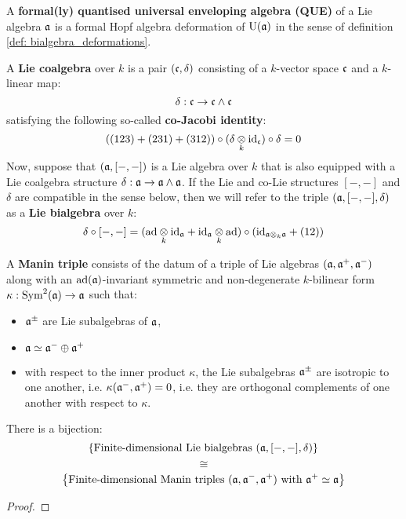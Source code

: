         \begin{definition} \label{def: formal_QUEs}
            A \textbf{formal(ly) quantised universal enveloping algebra (QUE)} of a Lie algebra $\mathfrak{a}$ is a formal Hopf algebra deformation of $\mathrm{U}(\mathfrak{a})$ in the sense of definition \ref{def: bialgebra_deformations}.
        \end{definition}
    
        \begin{definition} \label{def: lie_co/bialgebras}
            A \textbf{Lie coalgebra} over $k$ is a pair $(\mathfrak{c}, \delta)$ consisting of a $k$-vector space $\mathfrak{c}$ and a $k$-linear map:
                $$\delta: \mathfrak{c} \to \mathfrak{c} \wedge \mathfrak{c}$$
            satisfying the following so-called \textbf{co-Jacobi identity}:
                $$((123) + (231) + (312)) \circ (\delta \tensor_k \id_\c) \circ \delta = 0$$
            Now, suppose that $(\mathfrak{a}, [-, -])$ is a Lie algebra over $k$ that is also equipped with a Lie coalgebra structure $\delta: \mathfrak{a} \to \mathfrak{a} \wedge \mathfrak{a}$. If the Lie and co-Lie structures $[-, -]$ and $\delta$ are compatible in the sense below, then we will refer to the triple $(\mathfrak{a}, [-, -], \delta)$ as a \textbf{Lie bialgebra} over $k$:
                $$\delta \circ [-, -] = (\ad \tensor_k \id_{\a} + \id_{\a} \tensor_k \ad) \circ (\id_{\a \tensor_k \a} + (12))$$
        \end{definition}
        \begin{definition} \label{def: manin_triples}
            A \textbf{Manin triple} consists of the datum of a triple of Lie algebras $(\mathfrak{a}, \mathfrak{a}^+, \mathfrak{a}^-)$ along with an $\mathrm{ad}(\mathfrak{a})$-invariant symmetric and non-degenerate $k$-bilinear form $\kappa: \mathrm{Sym}^2(\mathfrak{a}) \to \mathfrak{a}$ such that:
                \begin{itemize}
                    \item $\mathfrak{a}^{\pm}$ are Lie subalgebras of $\mathfrak{a}$,
                    \item $\mathfrak{a} \simeq \mathfrak{a}^- \oplus \mathfrak{a}^+$
                    \item with respect to the inner product $\kappa$, the Lie subalgebras $\mathfrak{a}^{\pm}$ are isotropic to one another, i.e. $\kappa(\mathfrak{a}^-, \mathfrak{a}^+) = 0$, i.e. they are orthogonal complements of one another with respect to $\kappa$.
                \end{itemize}
        \end{definition}
        \begin{proposition} \label{prop: manin_triples_classify_lie_bialgebras}
            There is a bijection:
                $$\left\{ \text{Finite-dimensional Lie bialgebras $(\mathfrak{a}, [-, -], \delta)$} \right\}$$
                $$\cong$$
                $$\left\{ \text{Finite-dimensional Manin triples $(\mathfrak{a}, \mathfrak{a}^-, \mathfrak{a}^+)$ with $\mathfrak{a}^+ \simeq \mathfrak{a}$} \right\}$$
        \end{proposition}
            \begin{proof}
                 
            \end{proof}
        \begin{example}
        \end{example}
        
